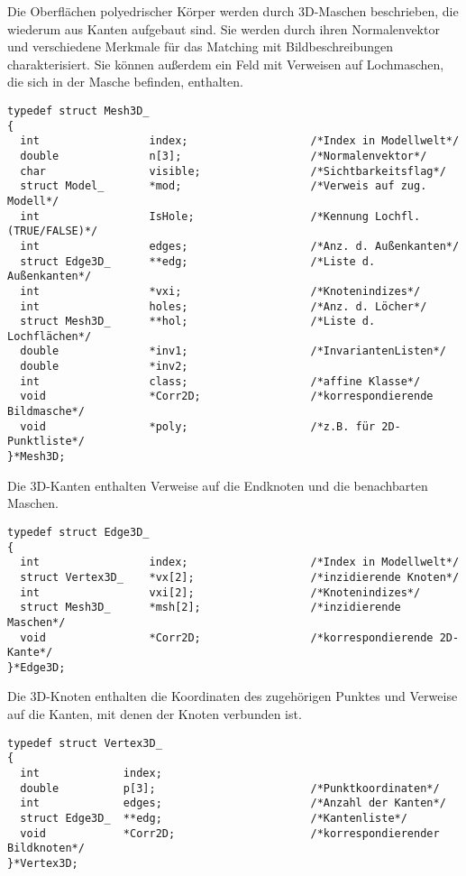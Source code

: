 Die Oberflächen polyedrischer Körper werden durch 3D-Maschen beschrieben, die
wiederum aus Kanten aufgebaut sind. Sie werden durch ihren Normalenvektor und
verschiedene Merkmale für das Matching mit Bildbeschreibungen
charakterisiert. Sie können außerdem ein Feld mit Verweisen auf Lochmaschen,
die sich in der Masche befinden, enthalten.
\begprogr\begin{verbatim}
typedef struct Mesh3D_
{
  int                 index;                   /*Index in Modellwelt*/
  double              n[3];                    /*Normalenvektor*/
  char                visible;                 /*Sichtbarkeitsflag*/
  struct Model_       *mod;                    /*Verweis auf zug. Modell*/
  int                 IsHole;                  /*Kennung Lochfl. (TRUE/FALSE)*/
  int                 edges;                   /*Anz. d. Außenkanten*/
  struct Edge3D_      **edg;                   /*Liste d. Außenkanten*/
  int                 *vxi;                    /*Knotenindizes*/
  int                 holes;                   /*Anz. d. Löcher*/
  struct Mesh3D_      **hol;                   /*Liste d. Lochflächen*/
  double              *inv1;                   /*InvariantenListen*/
  double              *inv2;
  int                 class;                   /*affine Klasse*/
  void                *Corr2D;                 /*korrespondierende Bildmasche*/
  void                *poly;                   /*z.B. für 2D-Punktliste*/
}*Mesh3D;
\end{verbatim}\endprogr

Die 3D-Kanten enthalten Verweise auf die Endknoten und die benachbarten Maschen.
\begprogr\begin{verbatim}
typedef struct Edge3D_
{
  int                 index;                   /*Index in Modellwelt*/
  struct Vertex3D_    *vx[2];                  /*inzidierende Knoten*/
  int                 vxi[2];                  /*Knotenindizes*/
  struct Mesh3D_      *msh[2];                 /*inzidierende Maschen*/
  void                *Corr2D;                 /*korrespondierende 2D-Kante*/
}*Edge3D;
\end{verbatim}\endprogr

Die 3D-Knoten enthalten die Koordinaten des zugehörigen Punktes und Verweise
auf die Kanten, mit denen der Knoten verbunden ist.
\begprogr\begin{verbatim}
typedef struct Vertex3D_
{
  int             index;
  double          p[3];                        /*Punktkoordinaten*/
  int             edges;                       /*Anzahl der Kanten*/
  struct Edge3D_  **edg;                       /*Kantenliste*/
  void            *Corr2D;                     /*korrespondierender Bildknoten*/
}*Vertex3D;
\end{verbatim}\endprogr


